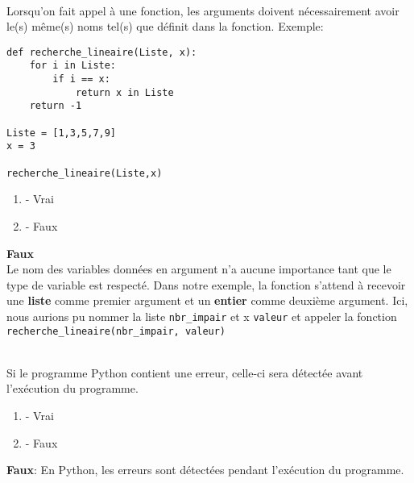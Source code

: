 \begin{Exercice}[2 minutes]\\
Lorsqu'on fait appel à une fonction, les arguments doivent nécessairement avoir le(s) même(s) noms tel(s) que définit dans la fonction. Exemple:\\
\begin{lstlisting}
def recherche_lineaire(Liste, x):
    for i in Liste:
        if i == x:
            return x in Liste
    return -1

Liste = [1,3,5,7,9]
x = 3

recherche_lineaire(Liste,x)

\end{lstlisting}
\begin{enumerate}
    \item - Vrai
    \item - Faux
\end{enumerate}
\begin{solution}
    \textbf{Faux}\\
    Le nom des variables données en argument n'a aucune importance tant que le type de variable est respecté. Dans notre exemple, la fonction s'attend à recevoir  une \textbf{liste} comme premier argument et un \textbf{entier} comme deuxième argument. Ici, nous aurions pu nommer la liste \lstinline{nbr_impair} et x \lstinline{valeur} et appeler la fonction \lstinline{recherche_lineaire(nbr_impair, valeur)}

\end{solution}
\end{Exercice}

\begin{Exercice}[2 minutes]\\
Si le programme Python contient une erreur, celle-ci sera détectée avant l'exécution du programme. 

\begin{enumerate}
    \item - Vrai
    \item - Faux
\end{enumerate}
\begin{solution}
    \textbf{Faux}: En Python, les erreurs sont détectées pendant l'exécution du programme.
\end{solution}
\end{Exercice}


